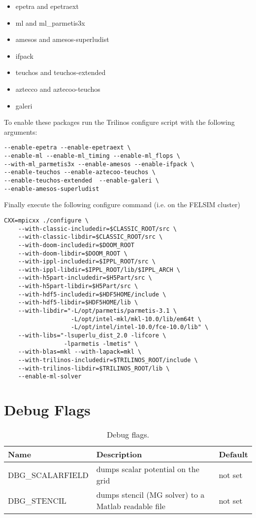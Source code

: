 \begin{itemize}
  \item epetra and epetraext
  \item ml and ml\_parmetis3x
  \item amesos and amesos-superludist
  \item ifpack
  \item teuchos and teuchos-extended
  \item aztecco and aztecoo-teuchos
  \item galeri 
\end{itemize}
To enable these packages run the Trilinos configure script with the following arguments:
\begin{verbatim}
--enable-epetra --enable-epetraext \
--enable-ml --enable-ml_timing --enable-ml_flops \
--with-ml_parmetis3x --enable-amesos --enable-ifpack \
--enable-teuchos --enable-aztecoo-teuchos \
--enable-teuchos-extended  --enable-galeri \
--enable-amesos-superludist
\end{verbatim}
Finally execute the following configure command (i.e. on the FELSIM cluster)
\begin{verbatim}
CXX=mpicxx ./configure \
    --with-classic-includedir=$CLASSIC_ROOT/src \
    --with-classic-libdir=$CLASSIC_ROOT/src \
    --with-doom-includedir=$DOOM_ROOT 
    --with-doom-libdir=$DOOM_ROOT \
    --with-ippl-includedir=$IPPL_ROOT/src \
    --with-ippl-libdir=$IPPL_ROOT/lib/$IPPL_ARCH \
    --with-h5part-includedir=$H5Part/src \
    --with-h5part-libdir=$H5Part/src \
    --with-hdf5-includedir=$HDF5HOME/include \
    --with-hdf5-libdir=$HDF5HOME/lib \
    --with-libdir="-L/opt/parmetis/parmetis-3.1 \
                   -L/opt/intel-mkl/mkl-10.0/lib/em64t \
                   -L/opt/intel/intel-10.0/fce-10.0/lib" \
    --with-libs="-lsuperlu_dist_2.0 -lifcore \
                 -lparmetis -lmetis" \
    --with-blas=mkl --with-lapack=mkl \
    --with-trilinos-includedir=$TRILINOS_ROOT/include \
    --with-trilinos-libdir=$TRILINOS_ROOT/lib \
    --enable-ml-solver
\end{verbatim}

\section{Debug Flags}\label{sec:debugflags}

\begin{table}[ht]\footnotesize
\caption{Debug flags.}
\label{tbl:debug_flags}
\begin{center}
\begin{tabular}{lll}
\hline
{\bf Name} & {\bf Description} & {\bf Default} \\
\hline
DBG\_SCALARFIELD & dumps scalar potential on the grid & not set \\
DBG\_STENCIL & dumps stencil (MG solver) to a Matlab readable file & not set \\
\hline
\end{tabular}
\end{center}
\end{table}

